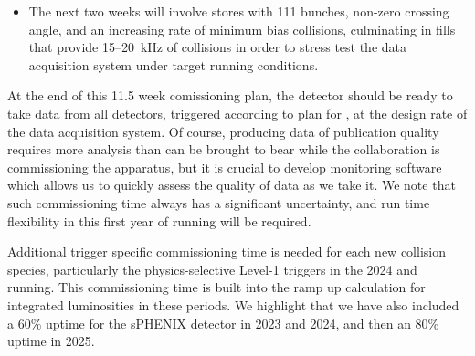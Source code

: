 \begin{itemize}
\item The next two weeks will involve stores with 111 bunches,
  non-zero crossing angle, and an increasing rate of minimum bias
  collisions, culminating in fills that provide 15--20~kHz of
  collisions in order to stress test the data acquisition system under
  target running conditions.

\end{itemize}

At the end of this 11.5 week comissioning plan, the detector should be
ready to take data from all detectors, triggered according to plan for
\auau, at the design rate of the data acquisition system.  Of course,
producing data of publication quality requires more analysis than can
be brought to bear while the collaboration is commissioning the
apparatus, but it is crucial to develop monitoring software which
allows us to quickly assess the quality of data as we take it.  We
note that such commissioning time always has a significant uncertainty,
and run time flexibility in this first year of running will be
required.

Additional trigger specific commissioning time is needed for each new
collision species, particularly the physics-selective Level-1 triggers
in the 2024 \pp and \pau running.  This commissioning time is built
into the ramp up calculation for integrated luminosities in these
periods.  We highlight that we have also included a 60\% uptime for
the sPHENIX detector in 2023 and 2024, and then an 80\% uptime in
2025.
